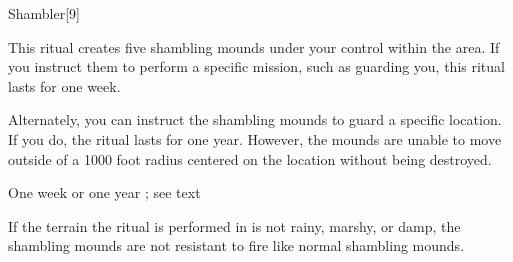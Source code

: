 \begin{spellsection}{Shambler}[9]
    \begin{spellheader}
    \end{spellheader}
    \begin{spellcontent}
        \begin{spelltargetinginfo}
        \end{spelltargetinginfo}
        \begin{spelleffects}

            \spelleffect This ritual creates five shambling mounds under your control within the area. If you instruct them to perform a specific mission, such as guarding you, this ritual lasts for one week.

            Alternately, you can instruct the shambling mounds to guard a specific location. If you do, the ritual lasts for one year. However, the mounds are unable to move outside of a 1000 foot radius centered on the location without being destroyed.

            \spelldur One week or one year \dismissable; see text
        \end{spelleffects}
    \end{spellcontent}
    \begin{spellfooter}
        \spellnotes If the terrain the ritual is performed in is not rainy, marshy, or damp, the shambling mounds are not resistant to fire like normal shambling mounds.
    \end{spellfooter}
\end{spellsection}

